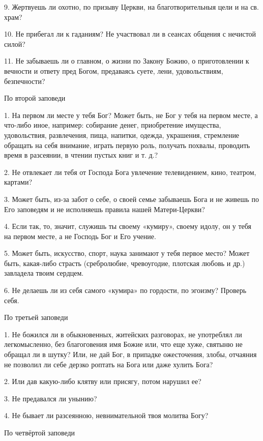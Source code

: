 9. Жертвуешь ли охотно, по призыву Церкви, на благотворительныя цели и на св. храм?

10. Не прибегал ли к гаданиям? Не участвовал ли в сеансах общения с нечистой силой?

11. Не забываешь ли о главном, о жизни по Закону Божию, о приготовлении к вечности и ответу пред Богом, предаваясь суете, лени, удовольствиям, безпечности? 

\bfseries \itshape 

По второй заповеди

\normalfont{}\normalfont{}1. На первом ли месте у тебя Бог? Может быть, не Бог у тебя на первом месте, а что-либо иное, например: собирание денег, приобретение имущества, удовольствия, развлечения, пища, напитки, одежда, украшения, стремление обращать на себя внимание, играть первую роль, получать похвалы, проводить время в разсеянии, в чтении пустых книг и т. д.?

2. Не отвлекает ли тебя от Господа Бога увлечение телевидением, кино, театром, картами?

3. Может быть, из-за забот о себе, о своей семье забываешь Бога и не живешь по Его заповедям и не исполняешь правила нашей Матери-Церкви?

4. Если так, то, значит, служишь ты своему «кумиру», своему идолу, он у тебя на первом месте, а не Господь Бог и Его учение.

5. Может быть, искусство, спорт, наука занимают у тебя первое место? Может быть, какая-либо страсть (сребролюбие, чревоугодие, плотская любовь и др.) завладела твоим сердцем.

6. Не делаешь ли из себя самого «кумира» по гордости, по эгоизму? Проверь себя. 

\bfseries \itshape 

По третьей заповеди

\normalfont{}\normalfont{}1. Не божился ли в обыкновенных, житейских разговорах, не употреблял ли легкомысленно, без благоговения имя Божие или, что еще хуже, святыню не обращал ли в шутку? Или, не дай Бог, в припадке ожесточения, злобы, отчаяния не позволил ли себе дерзко роптать на Бога или даже хулить Бога?

2. Или дав какую-либо клятву или присягу, потом нарушил ее?

3. Не предавался ли унынию?

4. Не бывает ли разсеянною, невнимательной твоя молитва Богу? 

\bfseries \itshape 

По четвёртой заповеди

